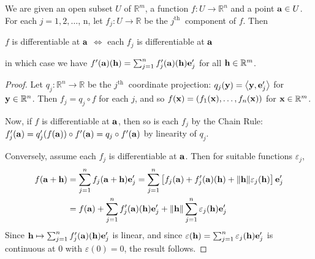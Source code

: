 \documentclass[a4paper,11pt]{article}
\begin{document}
\begin{proposition}\label{prop:deriv of projection}
    We are given an open subset $U$ of $\mathbb{R}^{m}$, a function $f: U \rightarrow \mathbb{R}^{n}$ and a point ${\bf a} \in U$. For each $j=1,2, \ldots$, n, let $f_{j}: U \rightarrow \mathbb{R}$ be the $j^{\text {th }}$ component of $f$. Then
    \begin{center}
        $f$ is differentiable at ${\bf a}$ $\Longleftrightarrow$ each $f_{j}$ is differentiable at ${\bf a}$
    \end{center}
    in which case we have $f^{\prime}({\bf a})({\bf h})=\sum_{j=1}^{n} f_{j}^{\prime}({\bf a})({\bf h}) {\bf e}_{j}^{\prime}$ for all ${\bf h} \in \mathbb{R}^{m}$.
\end{proposition}

\begin{proof}
    Let $q_{j}: \mathbb{R}^{n} \rightarrow \mathbb{R}$ be the $j^{\text {th }}$ coordinate projection: $q_{j}({\bf y})=\left\langle {\bf y}, {\bf e}_{j}^{\prime}\right\rangle$ for ${\bf y} \in \mathbb{R}^{n}$.
Then $f_{j}=q_{j} \circ f$ for each $j$, and so $f({\bf x})=\left(f_{1}({\bf x}), \ldots, f_{n}({\bf x})\right)$ for ${\bf x} \in \mathbb{R}^{m}$.

Now, if $f$ is differentiable at ${\bf a}$, then so is each $f_{j}$ by the Chain Rule:
$f_{j}^{\prime}({\bf a})=q_{j}^{\prime}(f({\bf a})) \circ f^{\prime}({\bf a})=q_{j} \circ f^{\prime}({\bf a})$ by linearity of $q_{j}$.

Conversely, assume each $f_{j}$ is differentiable at ${\bf a}$. Then for suitable functions $\varepsilon_{j}$,
$$
\begin{aligned}
f({\bf a}+{\bf h}) &=\sum_{j=1}^{n} f_{j}({\bf a}+{\bf h}) {\bf e}_{j}^{\prime}=\sum_{j=1}^{n}\left[f_{j}({\bf a})+f_{j}^{\prime}({\bf a})({\bf h})+\|{\bf h}\| \varepsilon_{j}({\bf h})\right] {\bf e}_{j}^{\prime} \\
&=f({\bf a})+\sum_{j=1}^{n} f_{j}^{\prime}({\bf a})({\bf h}) {\bf e}_{j}^{\prime}+\|{\bf h}\| \sum_{j=1}^{n} \varepsilon_{j}({\bf h}) {\bf e}_{j}^{\prime}
\end{aligned}
$$
Since ${\bf h} \mapsto \sum_{j=1}^{n} f_{j}^{\prime}({\bf a})({\bf h}) {\bf e}_{j}^{\prime}$ is linear, and since $\varepsilon({\bf h})=\sum_{j=1}^{n} \varepsilon_{j}({\bf h}) {\bf e}_{j}^{\prime}$ is continuous at 0 with $\varepsilon(0)=0$, the result follows.
\end{proof}
\end{document}
